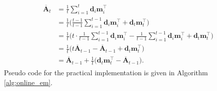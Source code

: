 \documentclass[msc,deptreport.inf]{infthesis} %
\newcommand{\matr}[1]{\mathbf{#1}}
\begin{document}
\begin{align}
\begin{split}
	\overline{\matr{A}}_t 
	& = \frac{1}{t} \sum_{i=1}^t \matr{d}_i \matr{m}_i^\intercal \\
	& = \frac{1}{t}\Bigg(\frac{t-1}{t-1} \sum_{i=1}^{t-1} \matr{d}_i \matr{m}_i^\intercal + \matr{d}_t \matr{m}_t^\intercal \Bigg) \\
	& = \frac{1}{t}\Bigg(t \cdot \frac{1}{t-1} \sum_{i=1}^{t-1} \matr{d}_i \matr{m}_i^\intercal - \frac{1}{t-1} \sum_{i=1}^{t-1} \matr{d}_i \matr{m}_i^\intercal + \matr{d}_t \matr{m}_t^\intercal \Bigg) \\
	& = \frac{1}{t}\Big(t \overline{\matr{A}}_{t-1} - \overline{\matr{A}}_{t-1} + \matr{d}_t \matr{m}_t^\intercal \Big) \\
	& = \overline{\matr{A}}_{t-1} + \frac{1}{t} \big(\matr{d}_t \matr{m}_t^\intercal - \overline{\matr{A}}_{t-1} \big).
\end{split}
\end{align}
Pseudo code for the practical implementation is given in Algorithm \ref{alg:online_em}.
\end{document}
